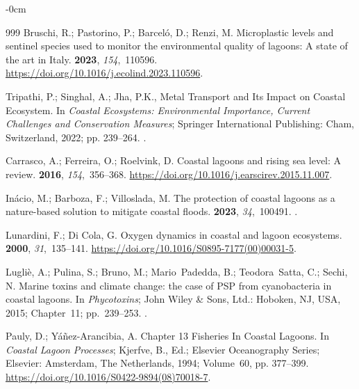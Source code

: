 \documentclass[jmse,article,accept,pdftex,oneauthor]{Definitions/mdpi}
\begin{document}
\begin{adjustwidth}{-\extralength}{0cm}
\begin{thebibliography}{999}
Bruschi, R.; Pastorino, P.; Barceló, D.; Renzi, M.
\newblock Microplastic levels and sentinel species used to monitor the
  environmental quality of lagoons: A state of the art in Italy.
 {\bf 2023}, {\em 154},~110596.
\newblock
  {\url{https://doi.org/10.1016/j.ecolind.2023.110596}}.

Tripathi, P.; Singhal, A.; Jha, P.K., Metal Transport and Its Impact on Coastal
  Ecosystem.
\newblock In {\em Coastal Ecosystems: Environmental Importance, Current
  Challenges and Conservation Measures}; Springer International Publishing:
  Cham, Switzerland,  
 2022; pp. 239--264.
.

Carrasco, A.; Ferreira, O.; Roelvink, D.
\newblock Coastal lagoons and rising sea level: A review.
 {\bf 2016}, {\em 154},~356--368.
\newblock
  {\url{https://doi.org/10.1016/j.earscirev.2015.11.007}}.

Inácio, M.; Barboza, F.; Villoslada, M.
\newblock The protection of coastal lagoons as a nature-based solution to
  mitigate coastal floods.
 {\bf 2023},
  {\em 34},~100491.
.

Lunardini, F.; {Di Cola}, G.
\newblock Oxygen dynamics in coastal and lagoon ecosystems.
 {\bf 2000}, {\em
  31},~135--141.
 {\url{https://doi.org/10.1016/S0895-7177(00)00031-5}}.

Lugliè, A.; Pulina, S.; Bruno, M.; Mario~Padedda, B.; Teodora~Satta, C.;
  Sechi, N. Marine toxins and climate change: the case of PSP from
  cyanobacteria in coastal lagoons.
\newblock In {\em Phycotoxins}; John Wiley \& Sons, Ltd.:  {Hoboken, NJ, USA,} %
 2015; Chapter~11; pp.~239--253.
.

Pauly, D.; Yáñez-Arancibia, A.
\newblock Chapter 13 Fisheries In Coastal Lagoons. In {\em Coastal Lagoon
  Processes}; Kjerfve, B., Ed.; Elsevier
  Oceanography Series; Elsevier:  {Amsterdam, The Netherlands,} %
 1994; Volume~60, pp. 377--399.
\newblock
  {\url{https://doi.org/10.1016/S0422-9894(08)70018-7}}.


\end{thebibliography}
\end{adjustwidth}
\end{document}
